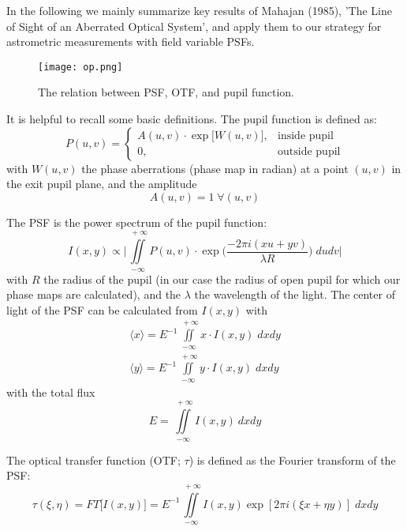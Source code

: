 In the following we mainly summarize key results of Mahajan (1985), 'The Line of Sight of an Aberrated Optical System', and apply them to our strategy for astrometric measurements with field variable PSFs.
\begin{figure}[h!]
\centering
\texttt{[image: op.png]}
\caption{\label{fig:op}The relation between PSF, OTF, and pupil function.}
\end{figure}
It is helpful to recall some basic definitions. The pupil function is defined as:
\begin{equation}
P(u,v) = \left\{\begin{array}{cl} A(u,v) \cdot \exp\big[W(u,v)\big], & \mbox{inside pupil}\\ 
0, & \mbox{outside pupil} \end{array}\right.
\end{equation}
with $W(u,v)$ the phase aberrations (phase map in radian) at a point $(u,v)$ in the exit pupil plane, and the amplitude
\begin{equation}\label{amp}
A(u,v) = 1 \; \forall (u,v)
\end{equation}

The PSF is the power spectrum of the pupil function:
\begin{equation}
I(x,y) \propto \Big \lvert \iint\limits_{-\infty}^{\: +\infty} P(u,v) \cdot \exp\Big(\frac{-2\pi i (xu+yv)}{\lambda R}\Big)\; dudv \Big \rvert
\end{equation}
with $R$ the radius of the pupil (in our case the radius of open pupil for which our phase maps are calculated), and the $\lambda$ the wavelength of the light. The center of light of the PSF can be calculated from $I(x,y)$ with
\begin{eqnarray}
\langle x \rangle = E^{-1} \iint\limits_{-\infty}^{\: +\infty} x \cdot I(x,y) \; dxdy \label{cl1}\\
\langle y \rangle = E^{-1} \iint\limits_{-\infty}^{\: +\infty} y \cdot I(x,y) \; dxdy \label{cl2}
\end{eqnarray}
with the total flux
\begin{equation}
E = \iint\limits_{-\infty}^{\; +\infty} I(x,y) \: dxdy
\end{equation}

The optical transfer function (OTF; $\tau$) is defined as the Fourier transform of the PSF:
\begin{equation}\label{ft}
\tau(\xi,\eta) = FT\big[I(x,y)\big] = E^{-1} \iint\limits_{-\infty}^{\: +\infty} I(x,y) \exp[2 \pi i (\xi x + \eta y)] \; dxdy
\end{equation}

